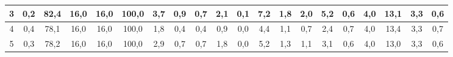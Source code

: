 \begin{sidewaystable}[]
\begin{tabular}{|c|c|c|c|c|c|c|c|c|c|c|c|c|c|c|c|c|c|c|c|}
    3  & 0,2                                              & 82,4                                            & 16,0                                            & 16,0                                            & 100,0                                           & 3,7                                             & 0,9                                             & 0,7                                             & 2,1                                             & 0,1                                             & 7,2                                              & 1,8                                              & 2,0                                              & 5,2                                              & 0,6                                              & 4,0                                              & 13,1                                             & 3,3                                              & 0,6                                              \\ \hline
    4  & 0,4                                              & 78,1                                            & 16,0                                            & 16,0                                            & 100,0                                           & 1,8                                             & 0,4                                             & 0,4                                             & 0,9                                             & 0,0                                             & 4,4                                              & 1,1                                              & 0,7                                              & 2,4                                              & 0,7                                              & 4,0                                              & 13,4                                             & 3,3                                              & 0,7                                              \\ \hline
    5  & 0,3                                              & 78,2                                            & 16,0                                            & 16,0                                            & 100,0                                           & 2,9                                             & 0,7                                             & 0,7                                             & 1,8                                             & 0,0                                             & 5,2                                              & 1,3                                              & 1,1                                              & 3,1                                              & 0,6                                              & 4,0                                              & 13,0                                             & 3,3                                              & 0,6                                              \\ \hline

\end{tabular}
\end{sidewaystable}
